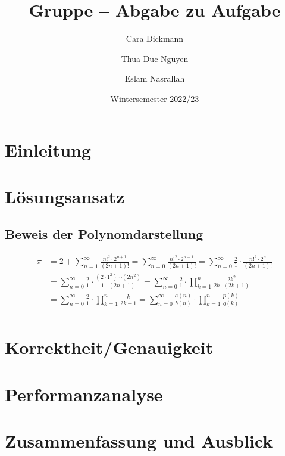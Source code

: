 \documentclass[course=erap]{aspdoc}
\author{Cara Dickmann \and Thua Duc Nguyen \and Eslam Nasrallah}
\date{Wintersemester 2022/23} %
\title{Gruppe \theGroup{} -- Abgabe zu Aufgabe \theNumber}
\begin{document}
\maketitle

\section{Einleitung}


\section{Lösungsansatz}

\subsection{Beweis der Polynomdarstellung}
\begin{align*}
    \pi &= 2 + \sum_{n=1}^{\infty} {\frac{n!^2 \cdot 2^{n+1} }{(2n+1)!}} 
    = \sum_{n=0}^{\infty} {\frac{n!^2 \cdot 2^{n+1} }{(2n+1)!}} 
    = \sum_{n=0}^{\infty} {\frac{2}{1} \cdot \frac{n!^2 \cdot 2^n}{(2n+1)!}} \\
    &= \sum_{n=0}^{\infty} {\frac{2}{1} \cdot \frac{(2 \cdot 1^2) \cdots (2 n^2)}{1 \cdots (2n+1)}}
    = \sum_{n=0}^{\infty} {\frac{2}{1} \cdot \prod_{k=1}^{n} {\frac{2k^2}{2k \cdot (2k+1)}}} \\
    &= \sum_{n=0}^{\infty} {\frac{2}{1} \cdot \prod_{k=1}^{n} {\frac{k}{2k+1}}}
    = \sum_{n=0}^{\infty} {\frac{a(n)}{b(n)} \cdot \prod_{k=1}^{n} {\frac{p(k)}{q(k)}}} \\
\label{eq:first}
\end{align*}






\section{Korrektheit/Genauigkeit}


\section{Performanzanalyse}


\section{Zusammenfassung und Ausblick}


{}
\end{document}

